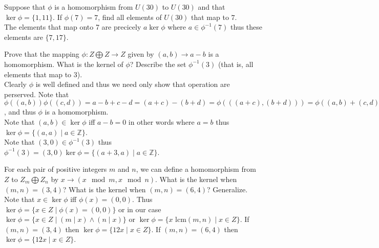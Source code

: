 \documentclass[12pt]{article}
\makeatletter
\theoremstyle{homework}
\newenvironment{exercise}[1]
{\def\@currentlabel{#1}\exercisecore}
{\endexercisecore}
\makeatother
\begin{document}
\begin{exercise}{10.31}
Suppose that $\phi$ is a homomorphism from $U(30)$ to $U(30)$ and that $\ker \phi = \{1, 11\}$. If $\phi(7) = 7$, find all elements of $U(30)$ that map to $7$.\\
The elements that map onto 7 are precicely $a\ker\phi$ where $a\in \phi^{-1}(7)$ thus these elements are $\{7,17\}$.
\end{exercise}

\begin{exercise}{10.35}
Prove that the mapping $\phi: Z \bigoplus Z \rightarrow Z$ given by $(a, b) \rightarrow a - b$ is a homomorphism. What is the kernel of $\phi$? Describe the set $\phi^{-1} (3)$ (that is, all elements that map to 3).\\
Clearly $\phi$ is well defined and thus we need only show that operation are perserved.  Note that $\phi((a,b))\phi((c,d))=a-b+c-d=(a+c)-(b+d)=\phi(((a+c),(b+d)))=\phi((a,b)+(c,d))$, and thus $\phi$ is a homomorphism.\\
Note that $(a,b)\in\ker\phi$ iff $a-b=0$ in other words where $a=b$ thus $\ker\phi =\{ (a,a)\mid a\in\mathbb{Z}\}$.\\
Note that $(3,0)\in\phi^{-1}(3)$ thus $\phi^{-1}(3)=(3,0)\ker\phi=\{ (a+3,a)\mid a\in\mathbb{Z}\}$.
\end{exercise}

\begin{exercise}{10.40}
For each pair of positive integers $m$ and $n$, we can define a homomorphism from $Z$ to $Z_m \bigoplus Z_n$ by $x \rightarrow (x \mod m, x \mod n)$. What is the kernel when $(m, n) = (3, 4)$? What is the kernel when $(m, n) = (6, 4)$? Generalize.\\
Note that $x\in\ker\phi$ iff $\phi(x)=(0,0)$.  Thus $\ker\phi=\{x\in Z\mid \phi(x)=(0,0)\}$ or in our case $\ker\phi=\{x\in Z\mid (m\mid x)\wedge(n\mid x) \}$ or $\ker\phi=\{x\text{ lcm}(m,n)\mid x\in Z\}$.  If $(m, n) = (3, 4)$ then $\ker\phi=\{12x\mid x\in Z\}$.  If $(m, n) = (6, 4)$ then $\ker\phi=\{12x\mid x\in Z\}$.
\end{exercise}
\end{document}
